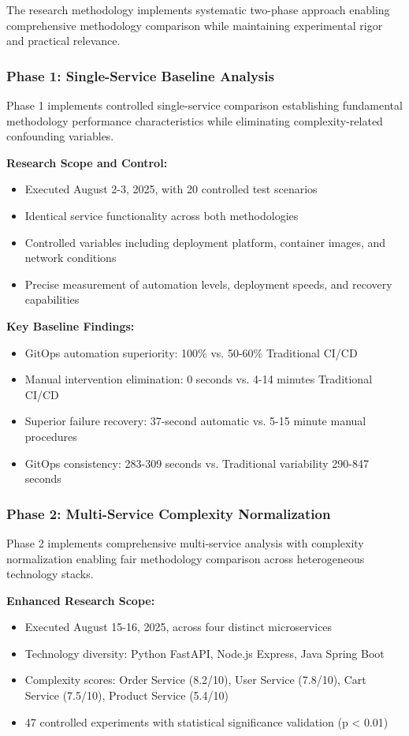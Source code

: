 The research methodology implements systematic two-phase approach enabling comprehensive methodology comparison while maintaining experimental rigor and practical relevance.

\subsubsection{Phase 1: Single-Service Baseline Analysis}

Phase 1 implements controlled single-service comparison establishing fundamental methodology performance characteristics while eliminating complexity-related confounding variables.

\textbf{Research Scope and Control:}
\begin{itemize}
\item Executed August 2-3, 2025, with 20 controlled test scenarios
\item Identical service functionality across both methodologies
\item Controlled variables including deployment platform, container images, and network conditions
\item Precise measurement of automation levels, deployment speeds, and recovery capabilities
\end{itemize}

\textbf{Key Baseline Findings:}
\begin{itemize}
\item GitOps automation superiority: 100\% vs. 50-60\% Traditional CI/CD
\item Manual intervention elimination: 0 seconds vs. 4-14 minutes Traditional CI/CD
\item Superior failure recovery: 37-second automatic vs. 5-15 minute manual procedures
\item GitOps consistency: 283-309 seconds vs. Traditional variability 290-847 seconds
\end{itemize}

\subsubsection{Phase 2: Multi-Service Complexity Normalization}

Phase 2 implements comprehensive multi-service analysis with complexity normalization enabling fair methodology comparison across heterogeneous technology stacks.

\textbf{Enhanced Research Scope:}
\begin{itemize}
\item Executed August 15-16, 2025, across four distinct microservices
\item Technology diversity: Python FastAPI, Node.js Express, Java Spring Boot
\item Complexity scores: Order Service (8.2/10), User Service (7.8/10), Cart Service (7.5/10), Product Service (5.4/10)
\item 47 controlled experiments with statistical significance validation (p < 0.01)
\end{itemize}

